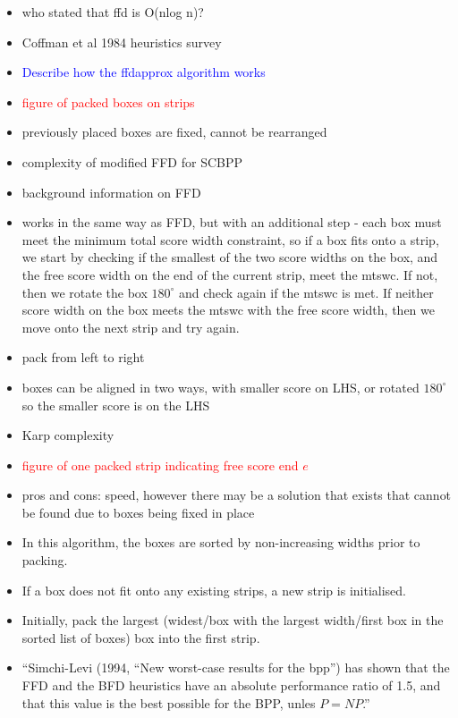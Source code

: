 \documentclass[oribibl]{llncs}
\begin{document}
\begin{itemize}
	\item who stated that ffd is O(nlog n)?
	\item Coffman et al 1984 heuristics survey
	\item \textcolor{blue}{Describe how the ffdapprox algorithm works}
	\item \textcolor{red}{figure of packed boxes on strips}
	\item previously placed boxes are fixed, cannot be rearranged
	\item complexity of modified FFD for SCBPP
	\item background information on FFD
	\item works in the same way as FFD, but with an additional step - each box must meet the minimum total score width constraint, so if a box fits onto a strip, we start by checking if the smallest of the two score widths on the box, and the free score width on the end of the current strip, meet the mtswc. If not, then we rotate the box $180^{\circ}$ and check again if the mtswc is met. If neither score width on the box meets the mtswc with the free score width, then we move onto the next strip and try again.
	\item pack from left to right
	\item boxes can be aligned in two ways, with smaller score on LHS, or rotated $180^{\circ}$ so the smaller score is on the LHS
	\item Karp complexity
	\item \textcolor{red}{figure of one packed strip indicating free score end $e$}
	\item pros and cons: speed, however there may be a solution that exists that cannot be found due to boxes being fixed in place
	\item In this algorithm, the boxes are sorted by non-increasing widths prior to packing.
	\item If a box does not fit onto any existing strips, a new strip is initialised.
	\item Initially, pack the largest (widest/box with the largest width/first box in the sorted list of boxes) box into the first strip.
	\item ``Simchi-Levi (1994, ``New worst-case results for the bpp'') has shown that the FFD and the BFD heuristics have an absolute performance ratio of 1.5, and that this value is the best possible for the BPP, unles $P = NP$.''
\end{itemize}
\end{document}
